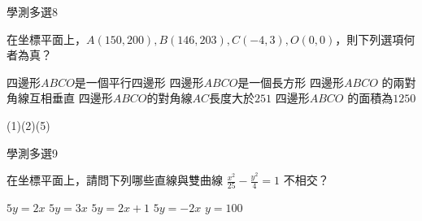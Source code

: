 \begin{QUESTIONS}
\begin{QUESTION}
        \begin{QEMPTYSPACE}
        \end{QEMPTYSPACE}
    \end{QUESTION}
    \begin{QUESTION}
        \begin{ExamInfo}{90}{學測}{多選}{8}
        \end{ExamInfo}
        \begin{ExamAnsRateInfo}{}{}{}{}
        \end{ExamAnsRateInfo}
        \begin{QBODY}
			在坐標平面上，$A(150,200),B(146,203),C(-4,3),O(0,0)$，則下列選項何者為真？
			\begin{QOPS}
				\QOP 四邊形$ABCO$是一個平行四邊形
				\QOP 四邊形$ABCO$是一個長方形
				\QOP 四邊形$ABCO$ 的兩對角線互相垂直
				\QOP 四邊形$ABCO$的對角線$AC$長度大於$251$
				\QOP 四邊形$ABCO$ 的面積為$1250$
			\end{QOPS}
        \end{QBODY}
        \begin{QFROMS}
        \end{QFROMS}
        \begin{QTAGS}\end{QTAGS}
        \begin{QANS}
            (1)(2)(5)
        \end{QANS}
        \begin{QSOLLIST}
        \end{QSOLLIST}
        \begin{QEMPTYSPACE}
        \end{QEMPTYSPACE}
    \end{QUESTION}
    \begin{QUESTION}
        \begin{ExamInfo}{90}{學測}{多選}{9}
        \end{ExamInfo}
        \begin{ExamAnsRateInfo}{}{}{}{}
        \end{ExamAnsRateInfo}
        \begin{QBODY}
			在坐標平面上，請問下列哪些直線與雙曲線 $\frac{{{x}^{2}}}{25}-\frac{{{y}^{2}}}{4}=1$ 不相交？
			\begin{QOPS}
				\QOP $5y=2x$
				\QOP $5y=3x$
				\QOP $5y=2x+1$
				\QOP $5y=-2x$
				\QOP $y=100$
			\end{QOPS}
        \end{QBODY}
        \begin{QFROMS}
        \end{QFROMS}

\end{QUESTION}
\end{QUESTIONS}
